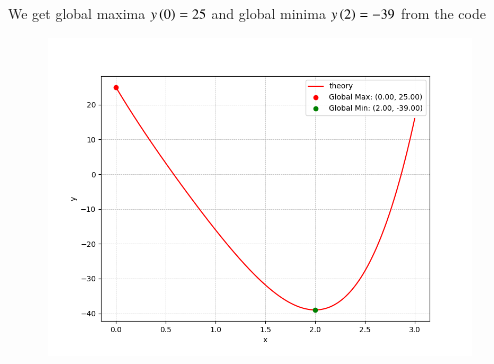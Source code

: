 \documentclass[journal,12pt,onecolumn]{IEEEtran}
\theoremstyle{remark}
\begin{document}
We get global maxima $y\left(0\right)=25$ and global minima $y\left(2\right)=-39$ from the code
\begin{figure}[h]
    \centering
    \includegraphics[width=\columnwidth]{figs/fig.png}
 \end{figure}
\end{document}
